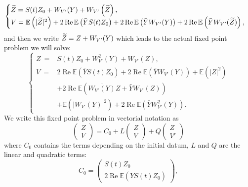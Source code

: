 \documentclass[AHL, Unicode, longabstracts,published]{cedram}
\newcommand{\E}{\mathbb{E}}
\DeclareMathOperator{\Rel}{Re}
\let\oldtilde\tilde
\renewcommand*{\tilde}[1]{\mathchoice{\widetilde{#1}}{\widetilde{#1}}{\oldtilde{#1}}{\oldtilde{#1}}}
\begin{document}
\[
\begin{cases}
\tilde Z = S(t) Z_0 + W_{V'}(Y) + W_{V'}\left(\tilde Z\right), \\
V = \E \left(|\tilde Z|^2\right) + 2 \Rel \E\left(\bar Y S(t) Z_0\right) + 2 \Rel \E\left(\bar Y W_{V'} (Y)\right) + 2 \Rel \E\left(\bar Y W_{V'}(\tilde Z)\right),
\end{cases}
\]
and then we write $\tilde Z = Z + W_{V'}(Y)$ which leads to the actual fixed point problem we will solve:
\begin{equation}\label{fixedpoint}
\begin{cases}
Z~=& S(t) Z_0 + W_{V'}^2(Y) + W_{V'}(Z), \\
V~=& 2 \Rel \E\left(\bar Y S(t) Z_0\right) + 2 \Rel \E\left(\bar Y W_{V'}(Y)\right)+ \E\left(|Z|^2\right)\\
& + 2 \Rel \E\left(\overline{W_{V'}(Y)} Z 
 + \bar Y W_{V'}(Z)\right)\\
 & + \E \left(\left|W_{V'}(Y)\right|^2\right) +2 \Rel \E\left(\bar Y W_{V'}^2 (Y)\right).
\end{cases}
\end{equation}
We write this fixed point problem in vectorial notation as
\begin{equation} \label{fixedpoint2}
\begin{pmatrix} Z \\ V
\end{pmatrix} = C_0 + L
\begin{pmatrix} Z \\ V
\end{pmatrix} + Q
\begin{pmatrix} Z \\ V'
\end{pmatrix}
\end{equation}
where $C_0$ contains the terms depending on the initial datum, $L$ and $Q$ are the linear and quadratic terms:
\[
C_0 =
\begin{pmatrix}
S(t) Z_0 \\ 2\Rel\E\left(\bar Y S(t) Z_0\right)
\end{pmatrix},
\]
\end{document}
